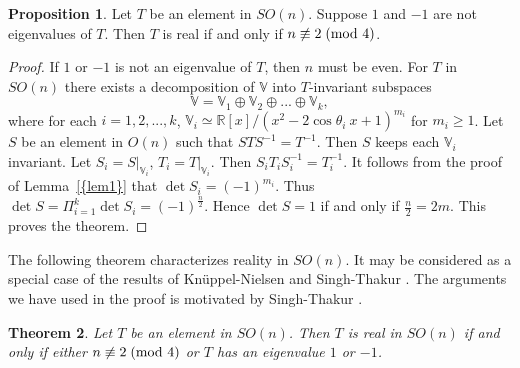 \documentclass[11pt]{amsart}
\newtheorem{theorem}{Theorem}[section]
\theoremstyle{definition}
\newtheorem{proposition}[theorem]{Proposition}
\theoremstyle{remark}
\numberwithin{equation}{section}
\theoremstyle{plain}
\begin{document}
\begin{proposition}\label{soprop}
Let $T$ be an element in $SO(n)$. Suppose $1$ and $-1$ are not eigenvalues of $T$.  Then $T$ is real if and only if $n \not \equiv 2\; (\hbox{mod }4)$.  
\end{proposition}

\begin{proof}
If $1$ or $-1$ is not an eigenvalue of $T$, then $n$ must be even. For $T$ in $SO(n)$ there exists a decomposition of ${\mathbb V}$ into $T$-invariant  subspaces 
$${\mathbb V} ={\mathbb V}_1 \oplus {\mathbb V}_2 \oplus ... \oplus {\mathbb V}_k,$$
where  for each $i=1,2,...,k$, ${\mathbb V}_i\simeq {\mathbb R}[x]/(x^2-2 \cos \theta_i \ x +1)^{m_i}$ for $m_i \geq 1$. Let $S$ be an element in $O(n)$ such that $STS^{-1}=T^{-1}$. Then $S$ keeps each ${\mathbb V}_i$ invariant. Let $S_i=S|_{{\mathbb V}_i}$, $T_i=T|_{{\mathbb V}_i}$. Then $S_i T_i S_i^{-1}=T_i^{-1}$. It follows from the proof of {Lemma~\ref{{lem1}}} that $\det S_i=(-1)^{m_i}$. 
Thus $\det S=\Pi_{i=1}^k \det S_i=(-1)^{\frac{n}{2}}$. Hence $\det S=1$ if and only if $\frac{n}{2}=2m$. This proves the theorem.  
\end{proof}

The following theorem characterizes reality in $SO(n)$.  It may be considered as a special case of the results of Kn\"uppel-Nielsen \cite{kn} and Singh-Thakur \cite{st1}. The arguments we have used in the proof is motivated by Singh-Thakur \cite[section 3.4]{st1}.

\begin{theorem}\label{thmson}
Let $T$ be an element in $SO(n)$. Then $T$ is real in $SO(n)$ if and only if either $n \not \equiv 2 \;(\hbox{mod }4)$ or $T$ has an eigenvalue $1$ or $-1$. 
\end{theorem}
\end{document}
